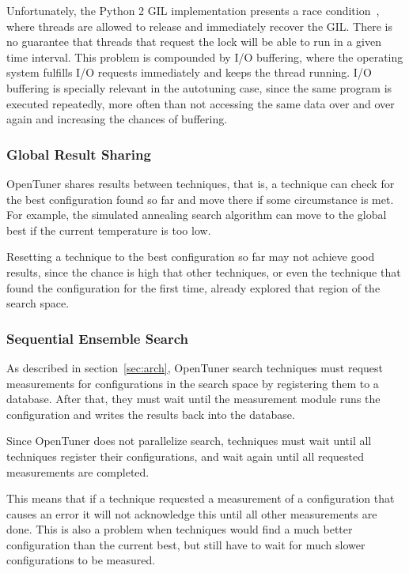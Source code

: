 Unfortunately, the Python 2 GIL implementation presents a race
condition~\cite{beazley2010understanding}, where threads are allowed to release
and immediately recover the GIL.  There is no guarantee that threads that
request the lock will be able to run in a given time interval. This problem is
compounded by I/O buffering, where the operating system fulfills I/O requests
immediately and keeps the thread running.  I/O buffering is specially relevant
in the autotuning case, since the same program is executed repeatedly, more
often than not accessing the same data over and over again and increasing the
chances of buffering.

\subsubsection{Global Result Sharing}

OpenTuner shares results between techniques, that is, a technique can check for
the best configuration found so far and move there if some circumstance is met.
For example, the simulated annealing search algorithm can move to the global
best if the current temperature is too low.

Resetting a technique to the best configuration so far may not achieve good
results, since the chance is high that other techniques, or even the
technique that found the configuration for the first time, already explored
that region of the search space.

\subsubsection{Sequential Ensemble Search}

As described in section~\ref{sec:arch}, OpenTuner search techniques must
request measurements for configurations in the search space by registering them
to a database. After that, they must wait until the measurement module
runs the configuration and writes the results back into the database.

Since OpenTuner does not parallelize search, techniques must wait until
all techniques register their configurations, and wait again until all
requested measurements are completed.

This means that if a technique requested a measurement of a configuration that
causes an error it will not acknowledge this until all other measurements are
done. This is also a problem when techniques would find a much better
configuration than the current best, but still have to wait for much slower
configurations to be measured.

